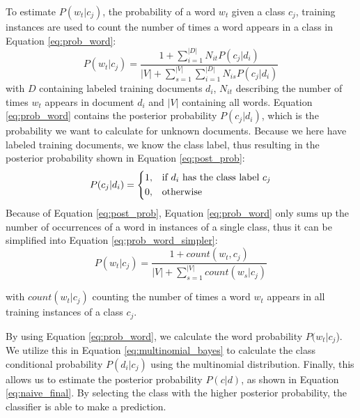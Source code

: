         To estimate $P(w_t|c_j)$, the probability of a word $w_t$ given a class $c_j$, training instances are used to count the number of times a word appears in a class in Equation \eqref{eq:prob_word}:
        \begin{equation}
            \label{eq:prob_word}
                P(w_t|c_j) = \frac{1 + \sum_{i=1}^{|D|}N_{it} P(c_j|d_i)}{|V| + \sum_{s=1}^{|V|} \sum_{i=1}^{|D|}N_{is} P (c_j|d_i)} 
        \end{equation}
        with $D$ containing labeled training documents $d_i$, $N_{it}$ describing the number of times $w_t$ appears in document $d_i$ and $|V|$ containing all words.
        Equation \eqref{eq:prob_word} contains the posterior probability $P(c_j|d_i)$, which is the probability we want to calculate for unknown documents. Because we here have labeled training documents, we know the class label, thus resulting in the posterior probability shown in Equation \eqref{eq:post_prob}:
        \begin{equation}
                \label{eq:post_prob}
                P(c_j|d_i)= 
                \begin{dcases}
                1,& \text{if } d_i \text{ has the class label } c_j \\
                0,              & \text{otherwise}
        \end{dcases}
        \end{equation}
        Because of Equation \eqref{eq:post_prob}, Equation \eqref{eq:prob_word} only sums up the number of occurrences of a word in instances of a single class, thus it can be simplified into Equation \eqref{eq:prob_word_simpler}:
                \begin{equation}
            \label{eq:prob_word_simpler}
                P(w_t|c_j) = \frac{1 + count(w_t, c_j)}{|V| + \sum_{s=1}^{|V|}count(w_s|c_j)} 
        \end{equation}

        with $count(w_t|c_j)$ counting the number of times a word $w_t$ appears in all training instances of a class $c_j$.
        
        By using Equation \eqref{eq:prob_word}, we calculate the word probability $P(w_t|c_j$). We utilize this in Equation \eqref{eq:multinomial_bayes} to calculate the class conditional probability $P(d_i|c_j)$ using the multinomial distribution. Finally, this allows us to estimate the posterior probability $P(c|d)$, as shown in Equation \eqref{eq:naive_final}. By selecting the class with the higher posterior probability, the classifier is able to make a prediction.
        

